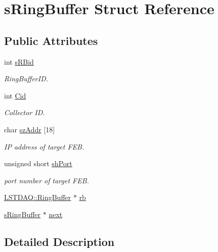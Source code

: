\hypertarget{structs_ring_buffer}{}\section{s\+Ring\+Buffer Struct Reference}
\label{structs_ring_buffer}
\subsection*{Public Attributes}
\begin{DoxyCompactItemize}
\item 
int \hyperlink{structs_ring_buffer_a86973832a168fb3fb15847da4407e590}{s\+R\+Bid}
\begin{DoxyCompactList}\small\item\em Ring\+Buffer\+I\+D. \end{DoxyCompactList}\item 
int \hyperlink{structs_ring_buffer_ac518da2b168acdf6876786ad38465d3d}{Cid}
\begin{DoxyCompactList}\small\item\em Collector I\+D. \end{DoxyCompactList}\item 
char \hyperlink{structs_ring_buffer_a3d8b0121e3a6f4c1657581c5446e67cc}{sz\+Addr} \mbox{[}18\mbox{]}
\begin{DoxyCompactList}\small\item\em I\+P address of target F\+E\+B. \end{DoxyCompactList}\item 
unsigned short \hyperlink{structs_ring_buffer_a38ec2d7373bbb5e89f7282c3de49e564}{sh\+Port}
\begin{DoxyCompactList}\small\item\em port number of target F\+E\+B. \end{DoxyCompactList}\item 
\hyperlink{class_l_s_t_d_a_q_1_1_ring_buffer}{L\+S\+T\+D\+A\+Q\+::\+Ring\+Buffer} $\ast$ \hyperlink{structs_ring_buffer_a02e62b51275c98f3e74e6b04d9f3ecb6}{rb}
\item 
\hyperlink{structs_ring_buffer}{s\+Ring\+Buffer} $\ast$ \hyperlink{structs_ring_buffer_a3685b679b0732b84bbccb1f467638ea9}{next}
\end{DoxyCompactItemize}


\subsection{Detailed Description}

